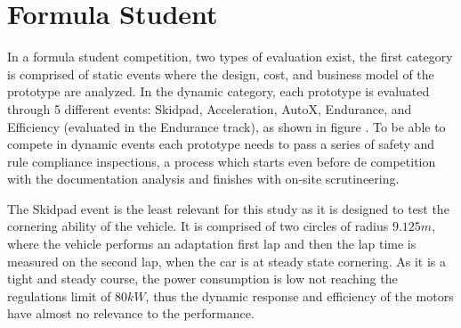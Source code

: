 
\section{Formula Student}

In a formula student competition, two types of evaluation exist, the first category is comprised of static events where the design, cost, and business model of the prototype are analyzed. In the dynamic category, each prototype is evaluated through 5 different events: Skidpad, Acceleration, AutoX, Endurance, and Efficiency (evaluated in the Endurance track), as shown in figure . To be able to compete in dynamic events each prototype needs to pass a series of safety and rule compliance inspections, a process which starts even before de competition with the documentation analysis and finishes with on-site scrutineering.

The Skidpad event is the least relevant for this study as it is designed to test the cornering ability of the vehicle. It is comprised of two circles of radius $9.125m$, where the vehicle performs an adaptation first lap and then the lap time is measured on the second lap, when the car is at steady state cornering. As it is a tight and steady course, the power consumption is low not reaching the regulations limit of $80kW$, thus the dynamic response and efficiency of the motors have almost no relevance to the performance. 

